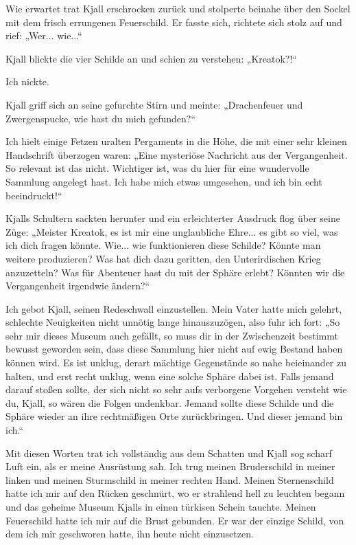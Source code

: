 Wie erwartet trat Kjall erschrocken zurück und stolperte beinahe über den Sockel mit dem frisch errungenen Feuerschild. Er fasste sich, richtete sich stolz auf und rief: „Wer... wie...“

Kjall blickte die vier Schilde an und schien zu verstehen: „Kreatok?!“

Ich nickte.

Kjall griff sich an seine gefurchte Stirn und meinte: „Drachenfeuer und Zwergenspucke, wie hast du mich gefunden?“

Ich hielt einige Fetzen uralten Pergaments in die Höhe, die mit einer sehr kleinen Handschrift überzogen waren: „Eine mysteriöse Nachricht aus der Vergangenheit. So relevant ist das nicht. Wichtiger ist, was du hier für eine wundervolle Sammlung angelegt hast. Ich habe mich etwas umgesehen, und ich bin echt beeindruckt!“

Kjalls Schultern sackten herunter und ein erleichterter Ausdruck flog über seine Züge: „Meister Kreatok, es ist mir eine unglaubliche Ehre... es gibt so viel, was ich dich fragen könnte. Wie... wie funktionieren diese Schilde? Könnte man weitere produzieren? Was hat dich dazu geritten, den Unterirdischen Krieg anzuzetteln? Was für Abenteuer hast du mit der Sphäre erlebt? Könnten wir die Vergangenheit irgendwie ändern?“

Ich gebot Kjall, seinen Redeschwall einzustellen. Mein Vater hatte mich gelehrt, schlechte Neuigkeiten nicht unnötig lange hinauszuzögen, also fuhr ich fort: „So sehr mir dieses Museum auch gefällt, so muss dir in der Zwischenzeit bestimmt bewusst geworden sein, dass diese Sammlung hier nicht auf ewig Bestand haben können wird. Es ist unklug, derart mächtige Gegenstände so nahe beieinander zu halten, und erst recht unklug, wenn eine solche Sphäre dabei ist. Falls jemand darauf stoßen sollte, der sich nicht so sehr aufs verborgene Vorgehen versteht wie du, Kjall, so wären die Folgen undenkbar. Jemand sollte diese Schilde und die Sphäre wieder an ihre rechtmäßigen Orte zurückbringen. Und dieser jemand bin ich.“

Mit diesen Worten trat ich vollständig aus dem Schatten und Kjall sog scharf Luft ein, als er meine Ausrüstung sah. Ich trug meinen Bruderschild in meiner linken und meinen Sturmschild in meiner rechten Hand. Meinen Sternenschild hatte ich mir auf den Rücken geschnürt, wo er strahlend hell zu leuchten begann und das geheime Museum Kjalls in einen türkisen Schein tauchte. Meinen Feuerschild hatte ich mir auf die Brust gebunden. Er war der einzige Schild, von dem ich mir geschworen hatte, ihn heute nicht einzusetzen.

